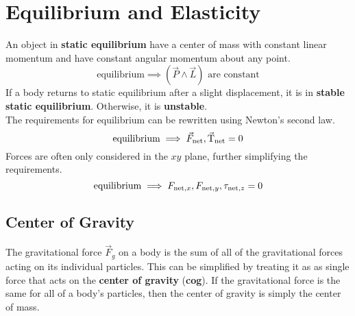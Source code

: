 \documentclass[../AP_Physics_C.tex]{subfiles}
\begin{document}
	\section{Equilibrium and Elasticity}
		An object in \textbf{static equilibrium} have a center of mass with constant linear momentum and have constant angular momentum about any point.
		\[\text{equilibrium} \implies (\vec{P} \land \vec{L}) \text{ are constant}\]
		If a body returns to static equilibrium after a slight displacement, it is in \textbf{stable static equilibrium}. Otherwise, it is \textbf{unstable}. \\
		The requirements for equilibrium can be rewritten using Newton's second law.
		\[\text{equilibrium} \implies \vec{F}_{\operatorname{net}}, \vec{\operatorname{T}}_{\operatorname{net}} = 0 \]
		Forces are often only considered in the $xy$ plane, further simplifying the requirements.
		\[\text{equilibrium} \implies F_{\operatorname{net},x}, F_{\operatorname{net}, y}, \tau_{\operatorname{net}, z} = 0\]
		\subsection{Center of Gravity}
			The gravitational force $\vec{F}_g$ on a body is the sum of all of the gravitational forces acting on its individual particles. This can be simplified by treating it as as single force that acts on the \textbf{center of gravity} (\textbf{cog}).
			If the gravitational force is the same for all of a body's particles, then the center of gravity is simply the center of mass.
\end{document}
